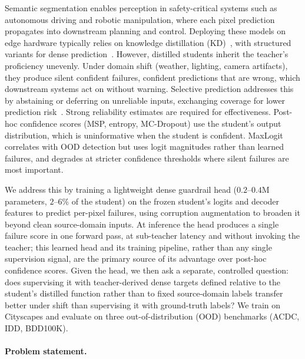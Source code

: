 \documentclass{article}
\begin{document}
Semantic segmentation enables perception in safety-critical systems such as autonomous driving and robotic manipulation, where each pixel prediction propagates into downstream planning and control. Deploying these models on edge hardware typically relies on knowledge distillation (KD)~\cite{hinton2015distilling}, with structured variants for dense prediction~\cite{liu2019structuredkd}. However, distilled students inherit the teacher's proficiency unevenly. Under domain shift (weather, lighting, camera artifacts), they produce silent confident failures, confident predictions that are wrong, which downstream systems act on without warning. Selective prediction addresses this by abstaining or deferring on unreliable inputs, exchanging coverage for lower prediction risk~\cite{geifman2017selective}. Strong reliability estimates are required for effectiveness. Post-hoc confidence scores (MSP, entropy, MC-Dropout) use the student's output distribution, which is uninformative when the student is confident. MaxLogit correlates with OOD detection but uses logit magnitudes rather than learned failures, and degrades at stricter confidence thresholds where silent failures are most important.

We address this by training a lightweight dense guardrail head ($0.2$--$0.4$M parameters, $2$--$6\%$ of the student) on the frozen student's logits and decoder features to predict per-pixel failures, using corruption augmentation to broaden it beyond clean source-domain inputs. At inference the head produces a single failure score in one forward pass, at sub-teacher latency and without invoking the teacher; this learned head and its training pipeline, rather than any single supervision signal, are the primary source of its advantage over post-hoc confidence scores. Given the head, we then ask a separate, controlled question: does supervising it with teacher-derived dense targets defined relative to the student's distilled function rather than to fixed source-domain labels transfer better under shift than supervising it with ground-truth labels? We train on Cityscapes and evaluate on three out-of-distribution (OOD) benchmarks (ACDC, IDD, BDD100K).


\paragraph{Problem statement.}
\end{document}
